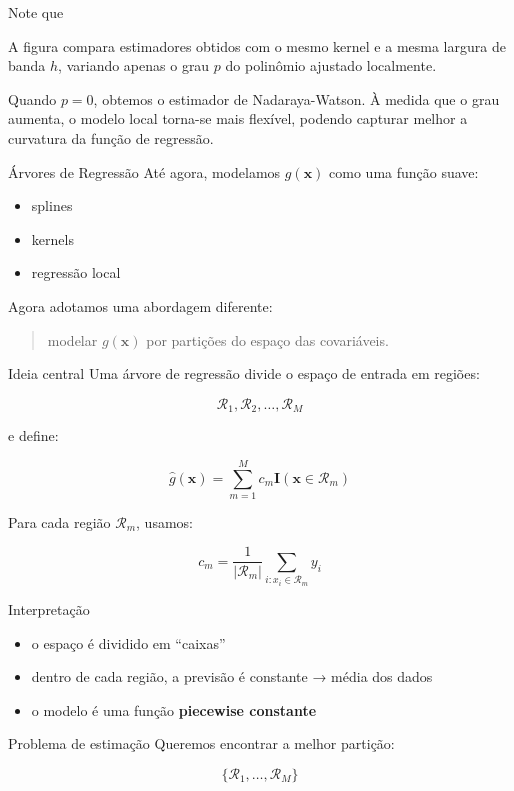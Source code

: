 \documentclass[
  ignorenonframetext,
  aspectratio=169,
]{beamer}
\providecommand{\tightlist}{%
  \setlength{\itemsep}{0pt}\setlength{\parskip}{0pt}}
\begin{document}
\begin{frame}
Note que

A figura compara estimadores obtidos com o mesmo kernel e a mesma
largura de banda \(h\), variando apenas o grau \(p\) do polinômio
ajustado localmente.

Quando \(p=0\), obtemos o estimador de Nadaraya-Watson. À medida que o
grau aumenta, o modelo local torna-se mais flexível, podendo capturar
melhor a curvatura da função de regressão.
\end{frame}

\begin{frame}{Árvores de Regressão}
\label{uxe1rvores-de-regressuxe3o}
Até agora, modelamos \(g(\mathbf{x})\) como uma função suave:

\begin{itemize}
\tightlist
\item
  splines\\
\item
  kernels\\
\item
  regressão local
\end{itemize}

Agora adotamos uma abordagem diferente:

\begin{quote}
modelar \(g(\mathbf{x})\) por partições do espaço das covariáveis.
\end{quote}
\end{frame}

\begin{frame}
\begin{block}{Ideia central}
\label{ideia-central-1}
Uma árvore de regressão divide o espaço de entrada em regiões:

\[
\mathcal{R}_1, \mathcal{R}_2, \ldots, \mathcal{R}_M
\]

e define:

\[
\hat{g}(\mathbf{x}) = \sum_{m=1}^M c_m \mathbf{I}(\mathbf{x} \in \mathcal{R}_m)
\]

Para cada região \(\mathcal{R}_m\), usamos:

\[
c_m = \frac{1}{|\mathcal{R}_m|} \sum_{i:x_i \in \mathcal{R}_m} y_i
\]
\end{block}
\end{frame}

\begin{frame}{Interpretação}
\label{interpretauxe7uxe3o-4}
\begin{itemize}
\tightlist
\item
  o espaço é dividido em ``caixas''
\item
  dentro de cada região, a previsão é constante → média dos dados
\item
  o modelo é uma função \textbf{piecewise constante}
\end{itemize}

\begin{block}{Problema de estimação}
\label{problema-de-estimauxe7uxe3o}
Queremos encontrar a melhor partição:

\[
\{\mathcal{R}_1, \ldots, \mathcal{R}_M\}
\]
\end{block}
\end{frame}
\end{document}
